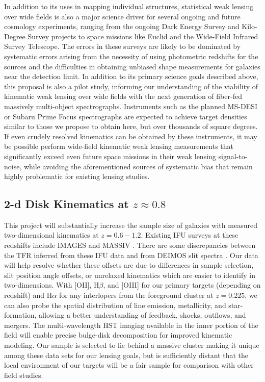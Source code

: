 \documentclass[12pt]{article}
\begin{document}
In addition to its uses in mapping individual structures, statistical weak lensing over wide fields is also a major science driver for several ongoing and future cosmology experiments, ranging from the ongoing Dark Energy Survey and Kilo-Degree Survey projects to space missions like Euclid and the Wide-Field Infrared Survey Telescope. The errors in these surveys are likely to be dominated by systematic errors arising from the necessity of using photometric redshifts for the sources and the difficulties in obtaining unbiased shape measurements for galaxies near the detection limit. In addition to its primary science goals described above, this proposal is also a pilot study, informing our understanding of the viability of kinematic weak lensing over wide fields with the next generation of fiber-fed massively multi-object spectrographs. Instruments such as the planned MS-DESI or Subaru Prime Focus spectrographs are expected to achieve target densities similar to those we propose to obtain here, but over thousands of square degrees. If even crudely resolved kinematics can be obtained by these instruments, it may be possible perform wide-field kinematic weak lensing measurements that significantly exceed even future space missions in their weak lensing signal-to-noise, while avoiding the aforementioned sources of systematic bias that remain highly problematic for existing lensing studies.

\subsection{2-d Disk Kinematics at $z\approx0.8$}

This project will substantially increase the sample size of galaxies with measured two-dimensional kinematics at $z=0.6-1.2$. Existing IFU surveys at these redshifts include IMAGES \citep[N=63;][]{Flores2006, Yang2008} and MASSIV \citep[N=84;][]{Contini2012}. There are some discrepancies between the TFR inferred from these IFU data and from DEIMOS slit spectra \citep[e.g. Figure 12 of][]{Kassin2012}. Our data will help resolve whether these offsets are due to differences in sample selection, slit position angle offsets, or unrelaxed kinematics which are easier to identify in two-dimensions. With [OII], H$\beta$, and [OIII] for our primary targets (depending on redshift) and H$\alpha$ for any interlopers from the foreground cluster at $z=0.225$, we can also probe the spatial distribution of line emission, metallicity, and star-formation, allowing a better understanding of feedback, shocks, outflows, and mergers. The multi-wavelength HST imaging available in the inner portion of the field will enable precise bulge-disk decomposition for improved kinematic modeling. Our sample is selected to lie behind a massive cluster making it unique among these data sets for our lensing goals, but is sufficiently distant that the local environment of our targets will be a fair sample for comparison with other field studies.
\end{document}
